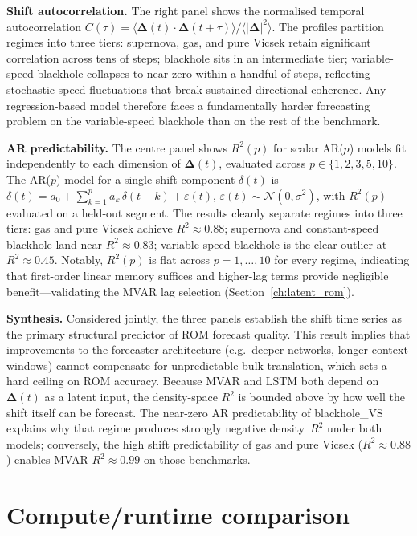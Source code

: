 \noindent\textbf{Shift autocorrelation.}
The right panel shows the normalised temporal autocorrelation
$C(\tau)=\langle\boldsymbol{\Delta}(t)\cdot\boldsymbol{\Delta}(t+\tau)\rangle
/\langle|\boldsymbol{\Delta}|^2\rangle$.
The profiles partition regimes into three tiers: supernova, gas, and pure
Vicsek retain significant correlation across tens of steps; blackhole sits
in an intermediate tier; variable-speed blackhole collapses to near zero
within a handful of steps, reflecting stochastic speed fluctuations that
break sustained directional coherence.  Any regression-based
model therefore faces a fundamentally harder forecasting problem on the
variable-speed blackhole than on the rest of the benchmark.

\noindent\textbf{AR predictability.}
The centre panel shows $R^2(p)$ for scalar AR($p$) models
fit independently to each dimension of
$\boldsymbol{\Delta}(t)$, evaluated across $p\in\{1,2,3,5,10\}$.
The AR($p$) model for a single shift component $\delta(t)$ is
$\delta(t) = a_0 + \sum_{k=1}^{p} a_k\,\delta(t-k) + \varepsilon(t)$,
$\varepsilon(t)\sim\mathcal{N}(0,\sigma^2)$,
with $R^2(p)$ evaluated on a held-out segment.
The results cleanly separate regimes into three tiers:
gas and pure Vicsek achieve $R^2\approx 0.88$;
supernova and constant-speed blackhole land near $R^2\approx 0.83$;
variable-speed blackhole is the clear outlier at $R^2\approx 0.45$.
Notably, $R^2(p)$ is flat across $p=1,\ldots,10$ for every regime,
indicating that first-order linear memory suffices and higher-lag terms
provide negligible benefit---validating the MVAR lag selection
(Section~\ref{ch:latent_rom}).

\noindent\textbf{Synthesis.}
Considered jointly, the three panels establish the shift time series as the
primary structural predictor of ROM forecast quality.  This result implies
that improvements to the forecaster architecture (e.g.\ deeper networks,
longer context windows) cannot compensate for unpredictable bulk translation,
which sets a hard ceiling on ROM accuracy.
Because MVAR and LSTM both depend on $\boldsymbol{\Delta}(t)$ as a latent input, the
density-space $R^2$ is bounded above by how well the shift itself can
be forecast.  The near-zero AR predictability of blackhole\_VS explains
why that regime produces strongly negative density~$R^2$ under both models;
conversely, the high shift predictability of gas and pure Vicsek
($R^2\approx 0.88$) enables MVAR $R^2\approx 0.99$ on those benchmarks.

\section{Compute/runtime comparison}

